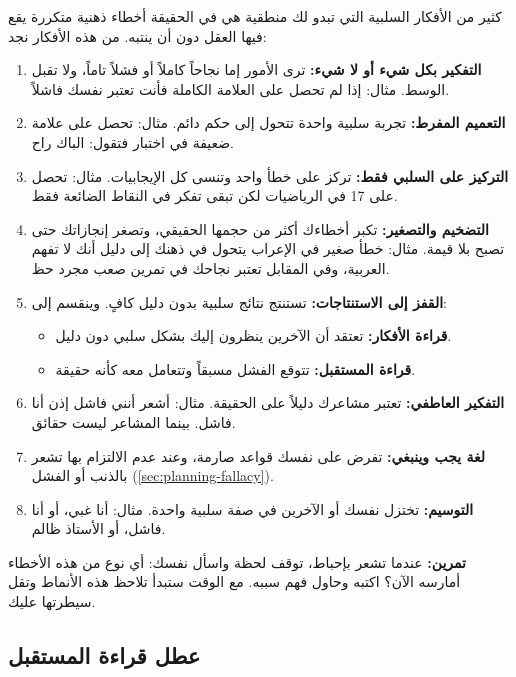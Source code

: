 \documentclass[12pt,a4paper]{book}
\newcommand{\exerciseAr}[1]{%
	\begin{exercise}
		\textbf{تمرين:} #1
	\end{exercise}
}
\begin{document}
	كثير من الأفكار السلبية التي تبدو لك منطقية هي في الحقيقة أخطاء ذهنية متكررة يقع فيها العقل دون أن ينتبه. من هذه الأفكار نجد:
\begin{enumerate}
	\item \textbf{التفكير بكل شيء أو لا شيء:} ترى الأمور إما نجاحاً كاملاً أو فشلاً تاماً، ولا تقبل الوسط. مثال: إذا لم تحصل على العلامة الكاملة فأنت تعتبر نفسك فاشلاً.
	
	\item \textbf{التعميم المفرط:} تجربة سلبية واحدة تتحول إلى حكم دائم. مثال: تحصل على علامة ضعيفة في اختبار فتقول: الباك راح.
	
	\item \textbf{التركيز على السلبي فقط:} تركز على خطأ واحد وتنسى كل الإيجابيات. مثال: تحصل على 17 في الرياضيات لكن تبقى تفكر في النقاط الضائعة فقط.
	
	\item \textbf{التضخيم والتصغير:} تكبر أخطاءك أكثر من حجمها الحقيقي، وتصغر إنجازاتك حتى تصبح بلا قيمة. مثال: خطأ صغير في الإعراب يتحول في ذهنك إلى دليل أنك لا تفهم العربية، وفي المقابل تعتبر نجاحك في تمرين صعب مجرد حظ.
	
	\item \textbf{القفز إلى الاستنتاجات:} تستنتج نتائج سلبية بدون دليل كافٍ. وينقسم إلى:
	\begin{itemize}
		\item \textbf{قراءة الأفكار:} تعتقد أن الآخرين ينظرون إليك بشكل سلبي دون دليل.
		\item \textbf{قراءة المستقبل:} تتوقع الفشل مسبقاً وتتعامل معه كأنه حقيقة.
	\end{itemize}
	
	\item \textbf{التفكير العاطفي:} تعتبر مشاعرك دليلاً على الحقيقة. مثال: أشعر أنني فاشل إذن أنا فاشل. بينما المشاعر ليست حقائق.
	
	\item \textbf{لغة يجب وينبغي:} تفرض على نفسك قواعد صارمة، وعند عدم الالتزام بها تشعر بالذنب أو الفشل (\ref{sec:planning-fallacy}).

	
	\item \textbf{التوسيم:} تختزل نفسك أو الآخرين في صفة سلبية واحدة. مثال: أنا غبي، أو أنا فاشل، أو الأستاذ ظالم.
\end{enumerate}

\exerciseAr{
	عندما تشعر بإحباط، توقف لحظة واسأل نفسك: أي نوع من هذه الأخطاء أمارسه الآن؟ اكتبه وحاول فهم سببه. مع الوقت ستبدأ تلاحظ هذه الأنماط وتقل سيطرتها عليك.
}

\subsection{عطل قراءة المستقبل}
\label{subsec:fortune-teller-error}
\end{document}
